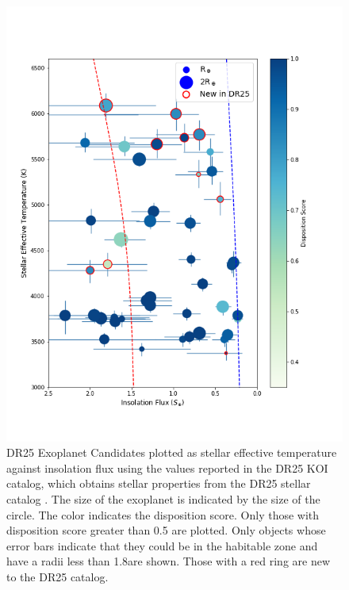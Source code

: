 \begin{figure}
    \centering
    \includegraphics[width=1.1\linewidth]{fig-hzTstarInsol.png}
    \caption{DR25 Exoplanet Candidates plotted as stellar effective temperature against insolation flux using the values reported in the DR25 KOI catalog, which obtains stellar properties from the DR25 stellar catalog \citep{Mathur2017ApJS}. The size of the exoplanet is indicated by the size of the circle.  The color indicates the disposition score. Only those with disposition score greater than 0.5 are plotted.  Only objects whose error bars indicate that they could be in the habitable zone and have a radii less than 1.8\re are shown. Those with a red ring are new to the DR25 catalog. }
    \label{f:hzPlot}
\end{figure}





